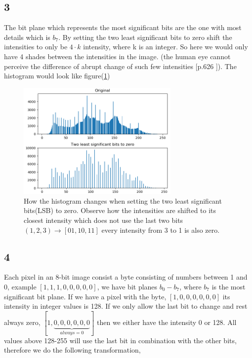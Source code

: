 {\subsection{3}
The bit plane which represents the most significant bits are the one with most details which is $b_{7}$. By setting the two least significant bits to zero shift the intensities to only be $4\cdot k$ intensity, where k is an integer. So here we would only have 4 shades between the intensities in the image. (the human eye cannot perceive the difference of abrupt change of such few intensities [p.626 \cite{dip}]). The histogram would look like figure(\ref{hist})
\begin{figure}[!htb]
    {\centering
        \includegraphics[width=0.70\textwidth]{bits.png}
        \caption{How the histogram changes when setting the two least significant bits(LSB) to zero. Observe how the intensities are shifted to its closest intensity which does not use the last two bits $(1,2,3) \rightarrow [01,10,11]$ every intensity from 3 to 1 is also zero.}
        \label{hist}
    \par}
    \end{figure}


    \subsection{4}

    Each pixel in an 8-bit image consist a byte consisting of numbers between 1 and 0, example $[1,1,1,0,0,0,0,0]$, we have bit planes $b_{0}-b_{7}$, where $b_{7}$ is the most significant bit plane. If we have a pixel with the byte, $[1,0,0,0,0,0,0]$ its intensity in integer values is 128. If we only allow the last bit to change and rest always zero, $[1,\underbrace{0,0,0,0,0,0}_{always = 0}]$ then we either have the intensity 0 or 128. All values above 128-255 will use the last bit in combination with the other bits, therefore we do the following transformation,
    
}

